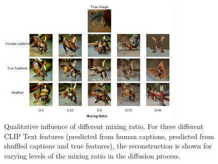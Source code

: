 \begin{figure}[ht]
    \centering
    \includegraphics[width=0.8\textwidth]{plots/aicap_reconstruction_evolution_test_0.JPEG}
    \caption[Influence of the mixing ratio]{Qualitative influence of different mixing ratio. For three different CLIP Text features (predicted from human captions, predicted from shuffled captions and true features), the reconstruction is shown for varying levels of the mixing ratio in the diffusion process. }\label{fig:aicap_reconstruction_evolution_test_0}
\end{figure}

